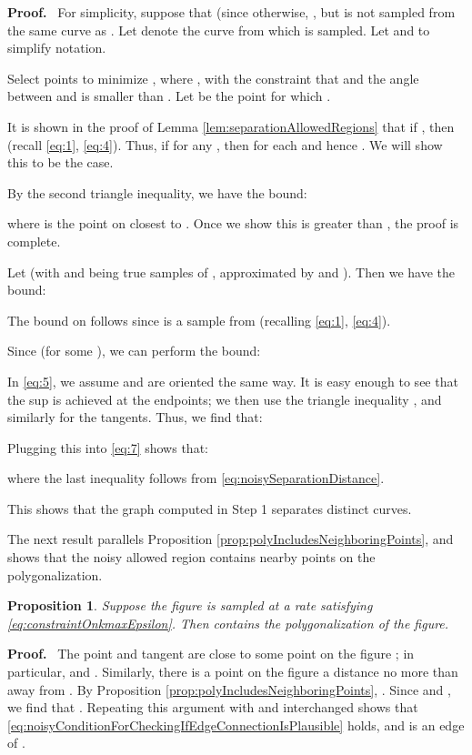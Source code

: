 \documentclass{article}
\newtheorem{proposition}[cntr]{Proposition}
\newenvironment{proof}{
  \noindent\textbf{Proof.}\ }{\hspace*{\fill}
  \medskip}
\numberwithin{cntr}{section}
\numberwithin{equation}{section}
\begin{document}
\begin{proof}
  For simplicity, suppose that  (since otherwise, , but  is not sampled from the same curve as . Let  denote the curve from which  is sampled. Let  and  to simplify notation.

  Select points  to minimize , where , with the constraint that  and the angle between  and  is smaller than . Let  be the point for which .

  It is shown in the proof of Lemma \ref{lem:separationAllowedRegions} that if , then  (recall \eqref{eq:1}, \eqref{eq:4}). Thus, if  for any , then  for each  and hence . We will show this to be the case.



  By the second triangle inequality, we have the bound:
  
  where  is the point on  closest to . Once we show this is greater than , the proof is complete.

Let  (with  and  being true samples of , approximated by  and ). Then we have the bound:
  
  The bound on  follows since  is a sample from  (recalling \eqref{eq:1}, \eqref{eq:4}).

  Since  (for some ), we can perform the bound:
  
  In \eqref{eq:5}, we assume  and  are oriented the same way. It is easy enough to see that the sup is achieved at the endpoints; we then use the triangle inequality , and similarly for the tangents.
  Thus, we find that:
  
  Plugging this into \eqref{eq:7} shows that:
  
  where the last inequality follows from \eqref{eq:noisySeparationDistance}.
\end{proof}

This shows that the graph  computed in Step 1 separates distinct curves.

The next result parallels Proposition \ref{prop:polyIncludesNeighboringPoints}, and shows that the noisy allowed region contains nearby points on the polygonalization.

\begin{proposition}
  Suppose the figure is sampled at a rate satisfying \eqref{eq:constraintOnkmaxEpsilon}. Then  contains the polygonalization of the figure.
\end{proposition}

\begin{proof}
  The point  and tangent  are close to some point  on the figure ; in particular,  and  . Similarly, there is a point  on the figure a distance no more than  away from . By Proposition \ref{prop:polyIncludesNeighboringPoints}, . Since  and , we find that . Repeating this argument with  and  interchanged shows that \eqref{eq:noisyConditionForCheckingIfEdgeConnectionIsPlausible} holds, and  is an edge of .
\end{proof}
\end{document}
